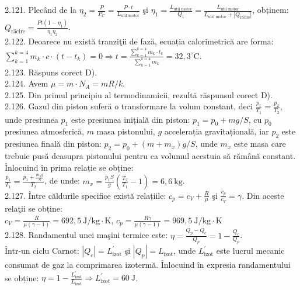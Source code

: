 2.121. Plecând de la $\eta_{2}=\frac{P}{P_{C}}=\frac{P \cdot t}{L_{\text {util motor}}}$ şi $\eta_{1}=\frac{L_{\text {util motor}}}{Q_{1}}=\frac{L_{\text {util motor}}}{L_{\text {util motor}}+\left|Q_{\text {răcire}}\right|}$, obținem:\\ $Q_{\text {rācire}}=\frac{P t\left(1-\eta_{1}\right)}{\eta_{1} \eta_{2}}$.\\

2.122. Deoarece nu există tranziţii de fază, ecuația calorimetrică are forma:\\ $\sum_{k=1}^{k=4} m_{k} \cdot c \cdot\left(t-t_{k}\right)=0 \Rightarrow t=\frac{\sum_{k=1}^{k=4} m_{k} \cdot t_{k}}{\sum_{k=1}^{k=4} m_{k}}=32,3^{\circ} \mathrm{C}$.\\

2.123. Răspuns corect D).\\

2.124. Avem $\mu=m \cdot N_{A}=m R / k$.\\

2.125. Din primul principiu al termodinamicii, rezultă răspunsul corect D).\\

2.126. Gazul din piston suferă o transformare la volum constant, deci $\frac{p_{1}}{T_{1}}=\frac{p_{2}}{T_{2}}$, unde presiunea $p_{1}$ este presiunea inițială din piston: $p_{1}=p_{0}+m g / S$, cu $p_{0}$ presiunea atmosferică, $m$ masa pistonului, $g$ accelerația gravitațională, iar $p_{2}$ este presiunea finală din piston: $p_{2}=p_{0}+\left(m+m_{x}\right) g / S$, unde $m_{x}$ este masa care trebuie pusă deasupra pistonului pentru ca volumul acestuia să rămână constant. Înlocuind în prima relație se obține:\\ $\frac{p_{1}}{T_{1}}=\frac{p_{1}+\frac{m_{x} g}{S}}{T_{2}}$, de unde: $m_{x}=\frac{p_{1} S}{g}\left(\frac{T_{2}}{T_{1}}-1\right)=6,6 \mathrm{~kg}$.\\

2.127. Între căldurile specifice există relațiile: $c_{p}=c_{V}+\frac{R}{\mu}$ şi $\frac{c_{p}}{c_{V}}=\gamma$. Din aceste relaţii se obține:\\ $c_{V}=\frac{R}{\mu(\gamma-1)}=692,5 \mathrm{~J} / \mathrm{kg} \cdot \mathrm{K}$, $c_{p}=\frac{R \gamma}{\mu(\gamma-1)}=969,5 \mathrm{~J} / \mathrm{kg} \cdot \mathrm{K}$\\

2.128. Randamentul unei maşini termice este: $\eta=\frac{Q_{p}-Q_{c}}{Q_{p}}=1-\frac{Q_{c}}{Q_{p}}$.\\ Într-un ciclu Carnot: $\left|Q_{c}\right|=L_{\text {izot}}^{\prime}$ şi $\left|Q_{p}\right|=L_{\text {izot}}$, unde $L_{\text {izot}}^{\prime}$ este lucrul mecanic consumat de gaz la comprimarea izotermă. Înlocuind în expresia randamentului se obține: $\eta=1-\frac{L_{\mathrm{izot}}^{\prime}}{L_{\mathrm{izot}}} \Rightarrow L_{\mathrm{izot}}^{\prime}=60 \mathrm{~J}$.\\

